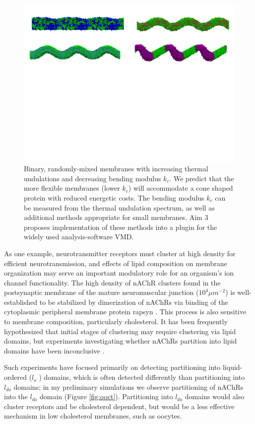 \documentclass{article}
\begin{document}
\begin{figure}[t!]
	\includegraphics[width=20cm]{./F31/MultiImageElastic.pdf}
	\caption{ Binary, randomly-mixed membranes with increasing thermal undulations and decreasing bending modulus $k_c$. We predict that the more flexible membranes (lower $k_c$) will accommodate a cone shaped protein with reduced energetic costs. The bending modulus $k_c$ can be measured from the thermal undulation spectrum, as well as additional methods appropriate for small membranes. Aim 3 proposes implementation of these methods into a plugin for the widely used analysis-software VMD.}
	\label{fig:elast}
\end{figure}

As one example, neurotransmitter receptors must cluster at high density for efficient neurotransmission, and effects of lipid composition on membrane organization may serve an important modulatory role for an organism's ion channel functionality. The high density of nAChR clusters found in the postsynaptic membrane of the mature neuromuscular junction ($10^4$$\mu m^{-2}$) is well-established to be stabilized by dimerization of nAChRs via binding of the cytoplasmic peripheral membrane protein rapsyn \cite{Zuber_Structure_2013}. This process is also sensitive to membrane composition, particularly cholesterol. It has been frequently hypothesized \cite{Zhu2006,Bruses2001} that initial stages of clustering may require clustering via lipid domains, but experiments investigating whether nAChRs partition into lipid domains have been inconclusive \cite{Bermdez_Partition_2010,Perillo2016}.

Such experiments have focused primarily on detecting partitioning into liquid-ordered ($l_o$ ) domains, which is often detected differently than partitioning into $l_{do}$ domains; in my preliminary simulations we observe partitioning of nAChRs into the $l_{do}$ domain (Figure \ref{fig:ooct}). Partitioning into $l_{do}$ domains would also cluster receptors and be cholesterol dependent, but would be a less effective mechanism in low cholesterol membranes, such as oocytes.
\end{document}
